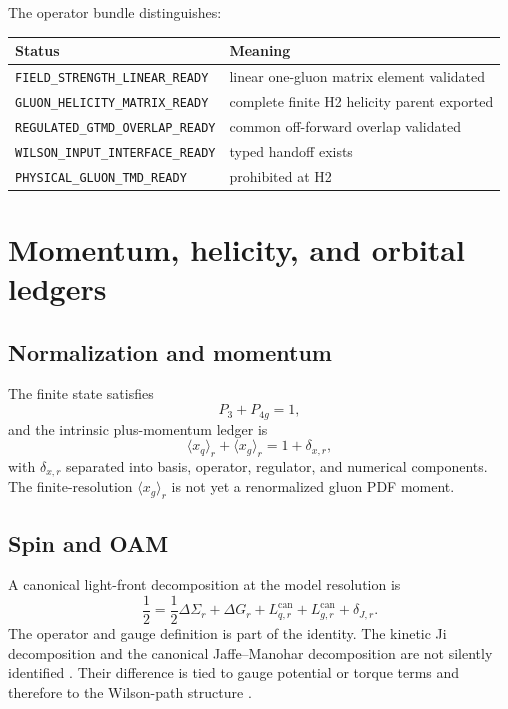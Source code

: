 \documentclass[11pt]{article}
\begin{document}
The operator bundle distinguishes:
\begin{center}
\begin{tabular}{ll}
\toprule
Status & Meaning\\
\midrule
\texttt{FIELD\_STRENGTH\_LINEAR\_READY} & linear one-gluon matrix element validated\\
\texttt{GLUON\_HELICITY\_MATRIX\_READY} & complete finite H2 helicity parent exported\\
\texttt{REGULATED\_GTMD\_OVERLAP\_READY} & common off-forward overlap validated\\
\texttt{WILSON\_INPUT\_INTERFACE\_READY} & typed handoff exists\\
\texttt{PHYSICAL\_GLUON\_TMD\_READY} & prohibited at H2\\
\bottomrule
\end{tabular}
\end{center}

\section{Momentum, helicity, and orbital ledgers}

\subsection{Normalization and momentum}

The finite state satisfies
\begin{equation}
 P_3+P_{4g}=1,
\end{equation}
and the intrinsic plus-momentum ledger is
\begin{equation}
 \langle x_q\rangle_r+\langle x_g\rangle_r=1
 +\delta_{x,r},
 \label{eq:momentum-ledger}
\end{equation}
with \(\delta_{x,r}\) separated into basis, operator, regulator, and numerical
components.  The finite-resolution \(\langle x_g\rangle_r\) is not yet a
renormalized gluon PDF moment.

\subsection{Spin and OAM}

A canonical light-front decomposition at the model resolution is
\begin{equation}
 \frac12
 =
 \frac12\Delta\Sigma_r
 +\Delta G_r
 +L_{q,r}^{\mathrm{can}}
 +L_{g,r}^{\mathrm{can}}
 +\delta_{J,r}.
 \label{eq:spin-ledger}
\end{equation}
The operator and gauge definition is part of the identity.  The kinetic Ji
decomposition and the canonical Jaffe--Manohar decomposition are not silently
identified \cite{Ji1997,JaffeManohar1990}.  Their difference is tied to gauge
potential or torque terms and therefore to the Wilson-path structure
\cite{Hatta2012}.
\end{document}
